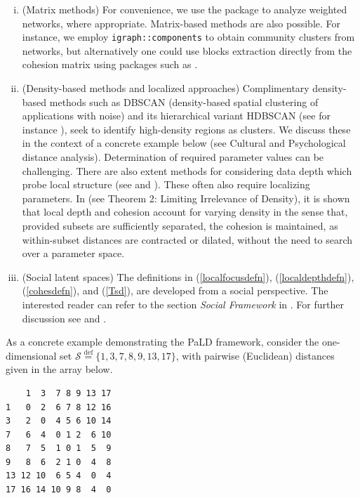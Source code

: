 \begin{enumerate}[(i)]
\item (Matrix methods) For convenience, we use the  package to analyze weighted networks, where appropriate.
Matrix-based methods are also possible. For instance, we employ  \texttt{igraph::components} to obtain community clusters from networks, but alternatively one could use blocks extraction directly from the cohesion matrix using packages such as .

\item (Density-based methods and localized approaches) Complimentary density-based methods such as DBSCAN (density-based spatial clustering of applications with noise) and its hierarchical variant HDBSCAN (see for instance \cite{campello2020density}), seek to identify high-density regions as clusters. We discuss these in the context of a concrete example below (see Cultural and Psychological distance analysis). Determination of required parameter values can be challenging. There are also extent methods for considering data depth which probe local structure (see \cite{paindaveine2013depth} and \cite{agostinelli2011local}). These often also require localizing parameters.
In \citet{berenhaut2022social} (see Theorem 2: Limiting Irrelevance of Density), it is shown that local depth and cohesion account for varying density in the sense that, provided subsets are sufficiently separated, the cohesion is maintained, as within-subset distances are contracted or dilated, without the need to search over a parameter space.

\item (Social latent spaces) The definitions in (\ref{localfocusdefn}), (\ref{localdepthdefn}), (\ref{cohesdefn}), and (\ref{Tsd}), are developed from a social perspective. The interested reader can refer to the section \textit{Social Framework} in \cite{berenhaut2022social}. For further discussion see \cite{berenhaut2024generalized} and \cite{berenhaut2022SIAM}.

\end{enumerate}

 As a concrete example demonstrating the PaLD framework, consider the one-dimensional set \(\mathcal{S}\stackrel{\mathrm{def}}{=}\{1,3,7,8,9,13,17\}\), with pairwise (Euclidean) distances given in the array below.

\begin{verbatim}
    1  3  7 8 9 13 17
1   0  2  6 7 8 12 16
3   2  0  4 5 6 10 14
7   6  4  0 1 2  6 10
8   7  5  1 0 1  5  9
9   8  6  2 1 0  4  8
13 12 10  6 5 4  0  4
17 16 14 10 9 8  4  0
\end{verbatim}

